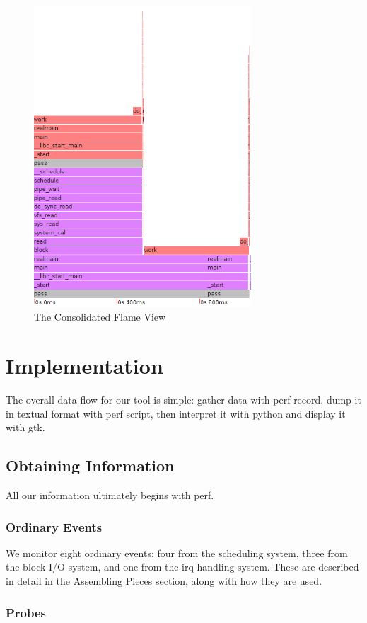 \documentclass[10pt]{article}
\begin{document}
\begin{figure}[h!]
\includegraphics[width=3.2in]{images/passcons}
\caption{The Consolidated Flame View}
\end{figure}

\section{Implementation}

The overall data flow for our tool is simple: gather data with perf record, dump it in textual format with perf script, then interpret it with python and display it with gtk.

\subsection{Obtaining Information}

All our information ultimately begins with perf.

\subsubsection{Ordinary Events}

We monitor eight ordinary events: four from the sched\-uling system, three from the block I/O system, and one from the irq handling system.  These are described in detail in the Assembling Pieces section, along with how they are used.

\subsubsection{Probes}
\end{document}

